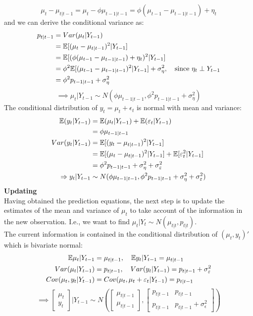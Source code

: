 \documentclass[DIV=14,titlepage=false]{scrreprt}
\begin{document}
\[ 
    \mu_t - \mu_{t|t-1} = \mu_t - \phi \mu_{t-1|t-1} = \phi(\mu_{t-1} - \mu_{t-1|t-1}) + \eta_t
\]
and we can derive the conditional variance as:
\begin{align*}
    p_{t|t-1} &= Var(\mu_t|Y_{t-1})\\
    &= \mathbb{E}[(\mu_t - \mu_{t|t-1})^2|Y_{t-1}]\\
    &= \mathbb{E}[(\phi(\mu_{t-1} - \mu_{t-1|t-1}) + \eta_t)^2|Y_{t-1}]\\
    &= \phi^2 \mathbb{E}[(\mu_{t-1} - \mu_{t-1|t-1})^2|Y_{t-1}] + \sigma^2_\eta, \quad \text{since $\eta_t \perp Y_{t-1}$}\\
    &= \phi^2 p_{t-1|t-1} + \sigma^2_\eta
\end{align*}
\[
    \implies \mu_{t} | Y_{t-1} \sim N(\phi \mu_{t-1|t-1}, \phi^2 p_{t-1|t-1} + \sigma^2_\eta)
\]
The conditional distribution of $y_t = \mu_t + \epsilon_t$ is normal with mean and variance:
\begin{align*}
    \mathbb{E} (y_t|Y_{t-1}) &= \mathbb{E}(\mu_t|Y_{t-1}) + \mathbb{E}(\varepsilon_t|Y_{t-1})\\
    &= \phi \mu_{t-1|t-1}\\
    Var(y_t|Y_{t-1}) &= \mathbb{E} [(y_t - \mu_{t|t-1})^2|Y_{t-1}]\\
    &= \mathbb{E}[(\mu_t - \mu_{t|t-1})^2|Y_{t-1}] + \mathbb{E} [\varepsilon_t^2|Y_{t-1}]\\
    &= \phi^2 p_{t-1|t-1} + \sigma^2_\eta + \sigma^2_\varepsilon\\
    \Rightarrow y_t|Y_{t-1} &\sim N(\phi \mu_{t-1|t-1}, \phi^2 p_{t-1|t-1} + \sigma^2_\eta + \sigma^2_\varepsilon)
\end{align*}
\textbf{Updating}\\
Having obtained the prediction equations, the next step is to update the estimates of the mean and variance of $\mu_t$ to take account of the information in the new observation. I.e., we want to find $\mu_t | Y_t \sim N(\mu_{t|t}, p_{t|t})$.\\
The current information is contained in the conditional distribution of $(\mu_t, y_t)'$ which is bivariate normal:
\begin{align*}
    \mathbb{E} \mu_t | Y_{t-1} &= \mu_{t|t-1}, \quad \mathbb{E} y_t | Y_{t-1} = \mu_{t|t-1}\\
    Var(\mu_t | Y_{t-1}) &= p_{t|t-1}, \quad Var(y_t | Y_{t-1}) = p_{t|t-1} + \sigma^2_\varepsilon\\
    Cov(\mu_t, y_t | Y_{t-1}) &= Cov(\mu_t, \mu_t + \varepsilon_t | Y_{t-1}) = p_{t|t-1}
\end{align*}
\[
    \implies \begin{bmatrix} \mu_t \\ y_t \end{bmatrix} | Y_{t-1} \sim N \left( \begin{bmatrix} \mu_{t|t-1} \\ \mu_{t|t-1} \end{bmatrix}, \begin{bmatrix} p_{t|t-1} & p_{t|t-1} \\ p_{t|t-1} & p_{t|t-1} + \sigma^2_\epsilon \end{bmatrix} \right)
\]
\end{document}
